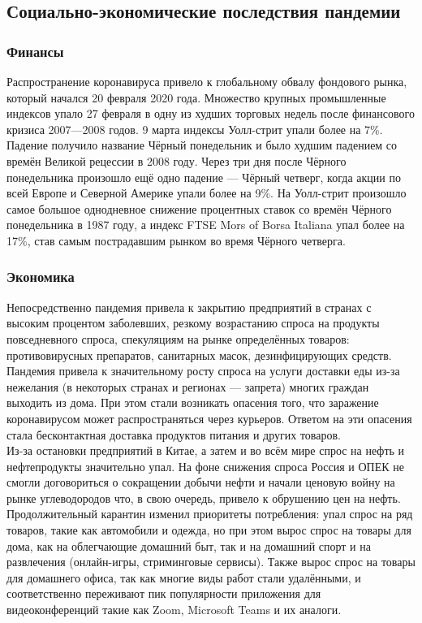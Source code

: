 \documentclass[a4paper, 12pt]{extarticle}
\begin{document}
\subsection{Социально-экономические последствия пандемии}
\subsubsection{Финансы}
Распространение коронавируса привело к глобальному обвалу фондового рынка, который начался 20 февраля 2020 года. Множество крупных промышленные индексов упало 27 февраля в одну из худших торговых недель после финансового кризиса 2007—2008 годов. 9 марта индексы Уолл-стрит упали более на 7\%. Падение получило название Чёрный понедельник и было худшим падением со времён Великой рецессии в 2008 году. Через три дня после Чёрного понедельника произошло ещё одно падение — Чёрный четверг, когда акции по всей Европе и Северной Америке упали более на 9\%. На Уолл-стрит произошло самое большое однодневное снижение процентных ставок со времён Чёрного понедельника в 1987 году, а индекс FTSE Mors of Borsa Italiana упал более на 17\%, став самым пострадавшим рынком во время Чёрного четверга.

\subsubsection{Экономика}
Непосредственно пандемия привела к закрытию предприятий в странах с высоким процентом заболевших, резкому возрастанию спроса на продукты повседневного спроса, спекуляциям на рынке определённых товаров: противовирусных препаратов, санитарных масок, дезинфицирующих средств.
\\

Пандемия привела к значительному росту спроса на услуги доставки еды из-за нежелания (в некоторых странах и регионах — запрета) многих граждан выходить из дома. При этом стали возникать опасения того, что заражение коронавирусом может распространяться через курьеров. Ответом на эти опасения стала бесконтактная доставка продуктов питания и других товаров.
\\

Из-за остановки предприятий в Китае, а затем и во всём мире спрос на нефть и нефтепродукты значительно упал. На фоне снижения спроса Россия и ОПЕК не смогли договориться о сокращении добычи нефти и начали ценовую войну на рынке углеводородов что, в свою очередь, привело к обрушению цен на нефть.
\\

Продолжительный карантин изменил приоритеты потребления: упал спрос на ряд товаров, такие как автомобили и одежда, но при этом вырос спрос на товары для дома, как на облегчающие домашний быт, так и на домашний спорт и на развлечения (онлайн-игры, стриминговые сервисы). Также вырос спрос на товары для домашнего офиса, так как многие виды работ стали удалёнными, и соответственно переживают пик популярности приложения для видеоконференций такие как Zoom, Microsoft Teams и их аналоги.
\end{document}

